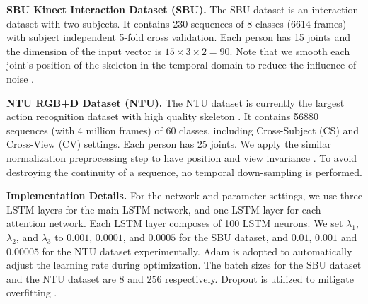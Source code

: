 \documentclass[letterpaper]{article}
\begin{document}
\textbf{SBU Kinect Interaction Dataset (SBU).} The SBU dataset is an interaction dataset with two subjects. It contains 230 sequences of 8 classes (6614 frames) with subject independent 5-fold cross validation. Each person has 15 joints and the dimension of the input vector is $15 \times 3 \times 2 = 90$. Note that we smooth each joint's position of the skeleton in the temporal domain to reduce the influence of noise \cite{CVPR15HRNN,zhu2015co}.


\textbf{NTU RGB+D Dataset (NTU).} The NTU dataset is currently the largest action recognition dataset with high quality skeleton \cite{Shahroudy_2016_CVPR}. It contains 56880 sequences (with 4 million frames) of 60 classes, including Cross-Subject (CS) and Cross-View (CV) settings. Each person has 25 joints. We apply the similar normalization preprocessing step to have position and view invariance \cite{Shahroudy_2016_CVPR}. To avoid destroying the continuity of a sequence, no temporal down-sampling is performed.


\textbf{Implementation Details.} For the network and parameter settings, we use three LSTM layers for the main LSTM network, and one LSTM layer for each attention network. Each LSTM layer composes of 100 LSTM neurons. We set $\lambda_1$, $\lambda_2$, and $\lambda_3$ to $0.001$, $0.0001$, and $0.0005$ for the SBU dataset, and $0.01$, $0.001$ and $0.00005$ for the NTU dataset experimentally. Adam \cite{kingma2014adam} is adopted to automatically adjust the learning rate during optimization. The batch sizes for the SBU dataset and the NTU dataset are $8$ and $256$ respectively. Dropout is utilized to mitigate overfitting \cite{ICLR15DropoutLSTM}.
\end{document}
